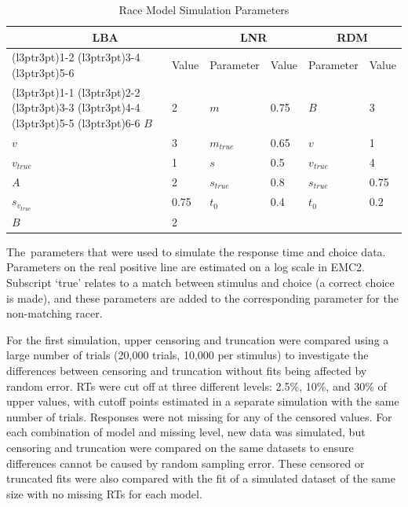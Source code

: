 \documentclass[
  man,
  floatsintext,
  longtable,
  nolmodern,
  notxfonts,
  notimes,
  colorlinks=true,linkcolor=blue,citecolor=blue,urlcolor=blue]{apa7}
\begin{document}
\begin{table}

{\caption{{Race Model Simulation Parameters}{\label{tbl-pars}}}
\vspace{-20pt}}

\begin{tabular}[t]{llllll}
\toprule
\multicolumn{2}{c}{LBA} & \multicolumn{2}{c}{LNR} & \multicolumn{2}{c}{RDM} \\
\cmidrule(l{3pt}r{3pt}){1-2} \cmidrule(l{3pt}r{3pt}){3-4} \cmidrule(l{3pt}r{3pt}){5-6}
\multicolumn{1}{c}{Parameter} & \multicolumn{1}{c}{Value} & \multicolumn{1}{c}{Parameter} & \multicolumn{1}{c}{Value} & \multicolumn{1}{c}{Parameter} & \multicolumn{1}{c}{Value} \\
\cmidrule(l{3pt}r{3pt}){1-1} \cmidrule(l{3pt}r{3pt}){2-2} \cmidrule(l{3pt}r{3pt}){3-3} \cmidrule(l{3pt}r{3pt}){4-4} \cmidrule(l{3pt}r{3pt}){5-5} \cmidrule(l{3pt}r{3pt}){6-6}
$B$ & 2 & $m$ & 0.75 & $B$ & 3\\
$v$ & 3 & $m_{true}$ & 0.65 & $v$ & 1\\
$v_{true}$ & 1 & $s$ & 0.5 & $v_{true}$ & 4\\
$A$ & 2 & $s_{true}$ & 0.8 & $s_{true}$ & 0.75\\
$s_{v_{true}}$ & 0.75 & $t_0$ & 0.4 & $t_0$ & 0.2\\
\addlinespace
$B$ & 2 &  &  &  & \\
\bottomrule
\end{tabular}

The~parameters that were used to simulate the response time and choice
data. Parameters on the real positive line are estimated on a log scale
in EMC2. Subscript `true' relates to a match between stimulus and choice
(a correct choice is made), and these parameters are added to the
corresponding parameter for the non-matching racer.

\end{table}

For the first simulation, upper censoring and truncation were compared
using a large number of trials (20,000 trials, 10,000 per stimulus) to
investigate the differences between censoring and truncation without
fits being affected by random error. RTs were cut off at three different
levels: 2.5\%, 10\%, and 30\% of upper values, with cutoff points
estimated in a separate simulation with the same number of trials.
Responses were not missing for any of the censored values. For each
combination of model and missing level, new data was simulated, but
censoring and truncation were compared on the same datasets to ensure
differences cannot be caused by random sampling error. These censored or
truncated fits were also compared with the fit of a simulated dataset of
the same size with no missing RTs for each model.
\end{document}
